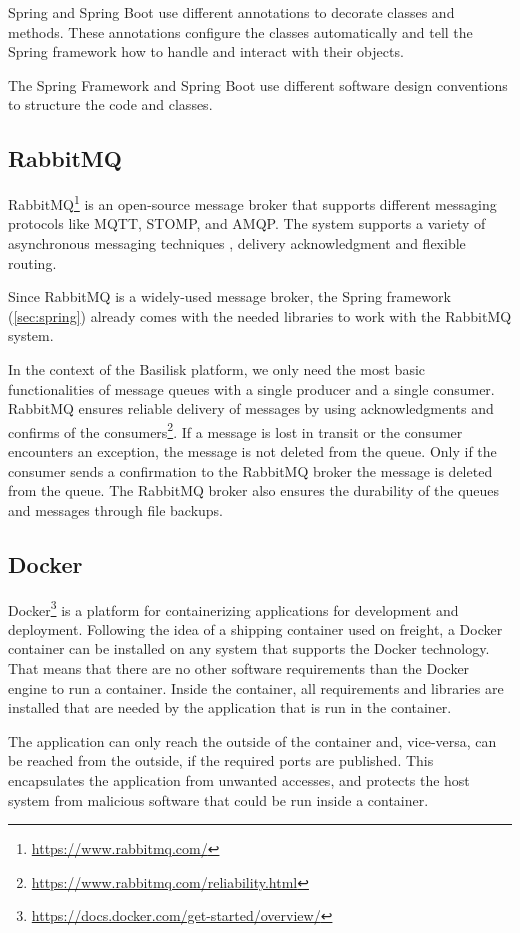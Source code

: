 Spring and Spring Boot use different annotations to decorate classes and methods.
These annotations configure the classes automatically and tell the Spring framework how to handle and interact with their objects.

The Spring Framework and Spring Boot use different software design conventions to structure the code and classes.


\subsection{RabbitMQ}
\label{sec:rabbitmq}
RabbitMQ\footnote{\url{https://www.rabbitmq.com/}} is an open-source message broker that supports different messaging protocols like MQTT, STOMP, and AMQP.
The system supports a variety of asynchronous messaging techniques \eg, delivery acknowledgment and flexible routing.

Since RabbitMQ is a widely-used message broker, the Spring framework (\ref{sec:spring}) already comes with the needed libraries to work with the RabbitMQ system.

In the context of the Basilisk platform, we only need the most basic functionalities of message queues with a single producer and a single consumer.
RabbitMQ ensures reliable delivery of messages by using acknowledgments and confirms of the consumers\footnote{\url{https://www.rabbitmq.com/reliability.html}}.
If a message is lost in transit or the consumer encounters an exception, the message is not deleted from the queue.
Only if the consumer sends a confirmation to the RabbitMQ broker the message is deleted from the queue.
The RabbitMQ broker also ensures the durability of the queues and messages through file backups.


\subsection{Docker}
Docker\footnote{\url{https://docs.docker.com/get-started/overview/}} is a platform for containerizing applications for development and deployment.
Following the idea of a shipping container used on freight, a Docker container can be installed on any system that supports the Docker technology.
That means that there are no other software requirements than the Docker engine to run a container.
Inside the container, all requirements and libraries are installed that are needed by the application that is run in the container.

The application can only reach the outside of the container and, vice-versa, can be reached from the outside, if the required ports are published.
This encapsulates the application from unwanted accesses, and protects the host system from malicious software that could be run inside a container.
\\

